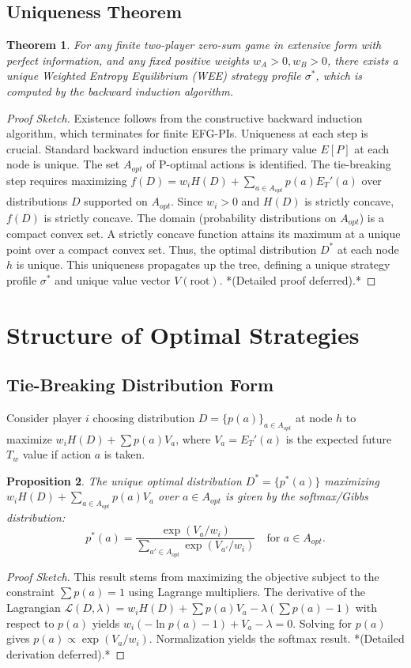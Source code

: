 \documentclass{article}
\newtheorem{theorem}{Theorem}[section]
\newtheorem{proposition}[theorem]{Proposition}
\begin{document}
\subsection{Uniqueness Theorem}
\begin{theorem} \label{thm:uniqueness}
For any finite two-player zero-sum game in extensive form with perfect information, and any fixed positive weights $w_A > 0, w_B > 0$, there exists a unique Weighted Entropy Equilibrium (WEE) strategy profile $\sigma^*$, which is computed by the backward induction algorithm.
\end{theorem}
\begin{proof}[Proof Sketch]
Existence follows from the constructive backward induction algorithm, which terminates for finite EFG-PIs. Uniqueness at each step is crucial. Standard backward induction ensures the primary value $E[P]$ at each node is unique. The set $A_{opt}$ of P-optimal actions is identified. The tie-breaking step requires maximizing $f(D) = w_i H(D) + \sum_{a \in A_{opt}} p(a) E_T'(a)$ over distributions $D$ supported on $A_{opt}$. Since $w_i > 0$ and $H(D)$ is strictly concave, $f(D)$ is strictly concave. The domain (probability distributions on $A_{opt}$) is a compact convex set. A strictly concave function attains its maximum at a unique point over a compact convex set. Thus, the optimal distribution $D^*$ at each node $h$ is unique. This uniqueness propagates up the tree, defining a unique strategy profile $\sigma^*$ and unique value vector $V(\text{root})$. *(Detailed proof deferred).*
\end{proof}

\section{Structure of Optimal Strategies}

\subsection{Tie-Breaking Distribution Form}
Consider player $i$ choosing distribution $D = \{p(a)\}_{a \in A_{opt}}$ at node $h$ to maximize $w_i H(D) + \sum p(a) V_a$, where $V_a = E_T'(a)$ is the expected future $T_w$ value if action $a$ is taken.
\begin{proposition} \label{prop:softmax}
The unique optimal distribution $D^* = \{p^*(a)\}$ maximizing $w_i H(D) + \sum_{a \in A_{opt}} p(a) V_a$ over $a \in A_{opt}$ is given by the softmax/Gibbs distribution:
\[ p^*(a) = \frac{\exp(V_a / w_i)}{\sum_{a' \in A_{opt}} \exp(V_{a'} / w_i)} \quad \text{for } a \in A_{opt}. \]
\end{proposition}
\begin{proof}[Proof Sketch]
This result stems from maximizing the objective subject to the constraint $\sum p(a) = 1$ using Lagrange multipliers. The derivative of the Lagrangian $\mathcal{L}(D, \lambda) = w_i H(D) + \sum p(a) V_a - \lambda(\sum p(a) - 1)$ with respect to $p(a)$ yields $w_i(-\ln p(a) - 1) + V_a - \lambda = 0$. Solving for $p(a)$ gives $p(a) \propto \exp(V_a / w_i)$. Normalization yields the softmax result. *(Detailed derivation deferred).*
\end{proof}
\end{document}
